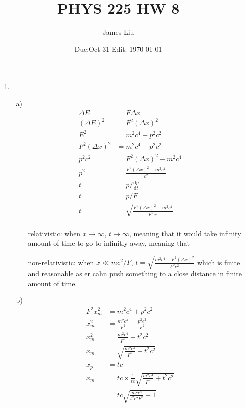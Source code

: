 \documentclass{article}
\date{Due:Oct 31 Edit: \today}
\title{PHYS 225 HW 8}
\author{James Liu}
\begin{document}
\maketitle
\begin{itemize}
    \item [1.]
    \begin{itemize}
        \item [a)]
        \begin{align*}
            \Delta E &= F\Delta x\\
            (\Delta E)^2 &= F^2(\Delta x)^2\\
            E^2 &= m^2c^4+p^2c^2\\
            F^2(\Delta x)^2 &=m^2c^4+p^2c^2\\
            p^2c^2 &=F^2(\Delta x)^2-m^2c^4\\
            p^2 &=\frac{F^2(\Delta x)^2-m^2c^4}{c^2}\\
            t&= p/\frac{\text{d}p}{\text{d}t}\\
            t &= p/F\\
            t &=\sqrt{\frac{F^2(\Delta x)^2-m^2c^4}{F^2c^2}}\\
        \end{align*}
        \begin{itemize}
            \item [relativistic:] when \(x\rightarrow \infty\), \(t\rightarrow\infty\), meaning that it would take infinity amount of time to go to infinitly away, meaning that 
            \item [non-relativistic:]when \(x\ll mc^2/F\), \(t = \sqrt{\frac{m^2c^4-F^2(\Delta x)^2}{F^2c^2}}\) which is finite and reasonable as er cahn push something to a close distance in finite amount of time.
        \end{itemize}
        \item [b)]
        \begin{align*}
            F^2x_m^2 &=m^2c^4+p^2c^2\\
            x_m^2&=\frac{m^2c^4}{F^2}+\frac{p^2c^2}{F^2}\\
            x_m^2&=\frac{m^2c^4}{F^2}+t^2c^2\\
            x_m &= \sqrt{\frac{m^2c^4}{F^2}+t^2c^2}\\
            x_p&=tc\\
            x_m &= tc\times \frac{1}{tc}\sqrt{\frac{m^2c^4}{F^2}+t^2c^2} \\
            &=tc\sqrt{\frac{m^2c^4}{t^2c^2F^2}+1}\\

\end{align*}
\end{itemize}
\end{itemize}
\end{document}
